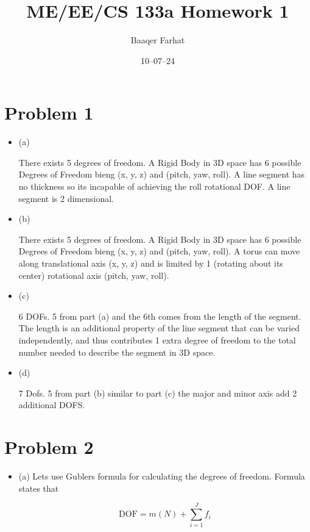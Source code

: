 \documentclass[12pt]{article}
\title{ME/EE/CS 133a Homework 1}
\author{Baaqer Farhat}
\date{10–07–24}
\begin{document}
\maketitle

\section{Problem 1}

\begin{itemize}

\item (a) 

There exists 5 degrees of freedom. A Rigid Body in 3D space has 6 possible Degrees of Freedom bieng (x, y, z) and (pitch, yaw, roll).
A line segment has no thickness so its incapable of achieving the roll rotational DOF. A line segment is 2 dimensional. 

\item (b)

There exists 5 degrees of freedom. A Rigid Body in 3D space has 6 possible Degrees of Freedom bieng (x, y, z) and (pitch, yaw, roll). A 
torus can move along translational axis (x, y, z) and is limited by 1 (rotating about its center) rotational axis (pitch, yaw, roll). 
\item (c)

6 DOFs. 5 from part (a) and the 6th comes from the length of the segment. The length is an additional property of the line segment that 
can be varied independently, and thus contributes 1 extra degree of freedom to the total number needed to describe the segment in 3D 
space.


\item (d)

7 Dofs. 5 from part (b) similar to part (c) the major and minor axis add 2 additional DOFS.

\end{itemize}

\section{Problem 2}

\begin{itemize}
    \item (a)
    Lets use Gublers formula for calculating the degrees of freedom. Formula states that 

    \begin{center}
        \[
        \text{DOF} = m(N) + \sum_{i=1}^{J} f_i
        \]
        \end{center}
        
        \end{itemize}
\end{document}
